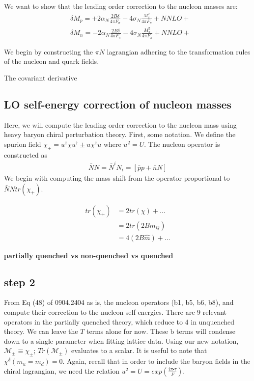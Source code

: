 \documentclass[12pt,tightenlines, raggedbottom, prd, notitlepage]{revtex4-1}
\def\mc#1{{\mathcal #1}}
\begin{document}
We want to show that the leading order correction to the nucleon masses are:
\begin{align*}
 &\delta M_p =  +2\alpha_N \frac{2B\delta}{4\pi F_\pi} - 4\sigma_N \frac{M^2_\pi}{4\pi F_\pi} + NNLO+ \\
 &\delta M_n = -2\alpha_N \frac{2B\delta}{4\pi F_\pi} - 4\sigma_N \frac{M^2_\pi}{4\pi F_\pi} + NNLO+
\end{align*}

We begin by constructing the $\pi N$ lagrangian adhering to the transformation rules
of the nucleon and quark fields. 

The covariant derivative 




\subsection*{LO self-energy correction of nucleon masses}

Here, we will compute the leading order correction to the nucleon mass using heavy baryon chiral perturbation theory. First, some notation. We define the spurion field $\chi_{\pm} = u^{\dagger}\chi u^{\dagger} \pm u\chi^{\dagger}u$ where $u^2 = U$.
The nucleon operator is constructed as 
\begin{align*}
  \bar{N}N = \bar{N}^iN_i = [\bar{p}p + \bar{n}N]
\end{align*}
We begin with computing the mass shift from the operator proportional to $\bar{N}Ntr(\chi_+)$. 

\begin{align*}
tr(\chi_+) &= 2tr(\chi) + \dots \\
&= 2tr(2Bm_Q) \\
&= 4(2B\hat{m}) + \dots
\end{align*}

\textbf{partially quenched vs non-quenched vs quenched}

\subsection*{step 2}
From Eq (48) of 0904.2404 as is, the nucleon operators (b1, b5, b6, b8), and compute their correction to the nucleon self-energies.
There are 9 relevant operators in the partially quenched theory, which reduce to 4 in unquenched theory.
We can leave the $T$ terms alone for now. These b terms will condense down to a single parameter when fitting 
lattice data.  Using our new notation, $\mc{M_\pm} \equiv \chi_\pm$; $Tr(\mc{M_\pm})$ evaluates
to a scalar. It is useful to note that $\chi^\delta(m_u = m_d) = 0$. Again, recall that in order to include the 
baryon fields in the chiral lagrangian, we need the relation $u^2=U=exp(\frac{i\pi \centerdot \tau}{F})$. 
\end{document}
